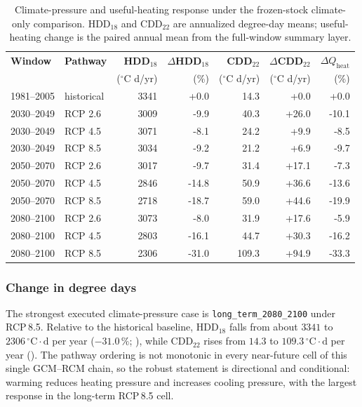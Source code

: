 \begin{table}[ht]
  \centering
  \footnotesize
  \caption{Climate-pressure and useful-heating response under the frozen-stock climate-only comparison. HDD$_{18}$ and CDD$_{22}$ are annualized degree-day means; useful-heating change is the paired annual mean from the full-window summary layer.}
  \label{tab:climate_degree_days_results}
  \begin{tabular}{@{}l l r r r r r@{}}
    \toprule
    \textbf{Window} & \textbf{Pathway} &
    \textbf{HDD$_{18}$} & $\Delta$\textbf{HDD$_{18}$} &
    \textbf{CDD$_{22}$} & $\Delta$\textbf{CDD$_{22}$} &
    $\Delta Q_{\text{heat}}$ \\
    & & ($^{\circ}$C d/yr) & (\%) & ($^{\circ}$C d/yr) & ($^{\circ}$C d/yr) & (\%) \\
    \midrule
    1981--2005 & historical & 3341 & +0.0 & 14.3 & +0.0 & +0.0 \\
    2030--2049 & RCP 2.6 & 3009 & -9.9 & 40.3 & +26.0 & -10.1 \\
    2030--2049 & RCP 4.5 & 3071 & -8.1 & 24.2 & +9.9 & -8.5 \\
    2030--2049 & RCP 8.5 & 3034 & -9.2 & 21.2 & +6.9 & -9.7 \\
    2050--2070 & RCP 2.6 & 3017 & -9.7 & 31.4 & +17.1 & -7.3 \\
    2050--2070 & RCP 4.5 & 2846 & -14.8 & 50.9 & +36.6 & -13.6 \\
    2050--2070 & RCP 8.5 & 2718 & -18.7 & 59.0 & +44.6 & -19.9 \\
    2080--2100 & RCP 2.6 & 3073 & -8.0 & 31.9 & +17.6 & -5.9 \\
    2080--2100 & RCP 4.5 & 2803 & -16.1 & 44.7 & +30.3 & -16.2 \\
    2080--2100 & RCP 8.5 & 2306 & -31.0 & 109.3 & +94.9 & -33.3 \\
    \bottomrule
  \end{tabular}
\end{table}

\subsubsection*{Change in degree days}
The strongest executed climate-pressure case is \texttt{long\_term\_2080\_2100} under RCP\,8.5. Relative to the historical baseline, HDD$_{18}$ falls from about $3341$ to $2306\,^{\circ}\mathrm{C}\cdot\mathrm{d}$ per year ($-31.0\,\%$; ), while CDD$_{22}$ rises from $14.3$ to $109.3\,^{\circ}\mathrm{C}\cdot\mathrm{d}$ per year (). The pathway ordering is not monotonic in every near-future cell of this single GCM--RCM chain, so the robust statement is directional and conditional: warming reduces heating pressure and increases cooling pressure, with the largest response in the long-term RCP\,8.5 cell.

